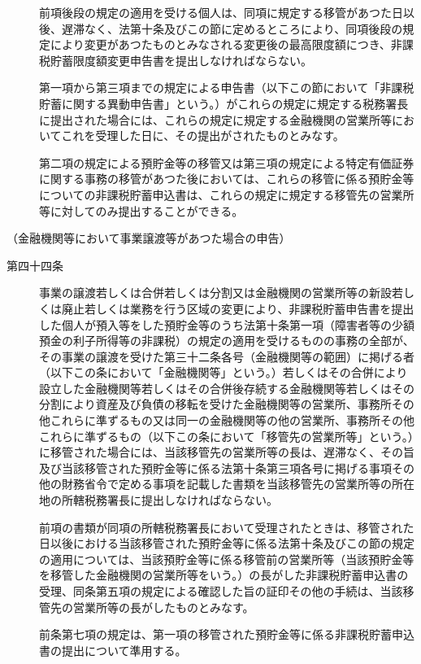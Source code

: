 \documentclass[twocolumn,a4j,10pt]{ltjtarticle}
\begin{document}
\begin{description}
\item[]前項後段の規定の適用を受ける個人は、同項に規定する移管があつた日以後、遅滞なく、法第十条及びこの節に定めるところにより、同項後段の規定により変更があつたものとみなされる変更後の最高限度額につき、非課税貯蓄限度額変更申告書を提出しなければならない。
\item[]第一項から第三項までの規定による申告書（以下この節において「非課税貯蓄に関する異動申告書」という。）がこれらの規定に規定する税務署長に提出された場合には、これらの規定に規定する金融機関の営業所等においてこれを受理した日に、その提出がされたものとみなす。
\item[]第二項の規定による預貯金等の移管又は第三項の規定による特定有価証券に関する事務の移管があつた後においては、これらの移管に係る預貯金等についての非課税貯蓄申込書は、これらの規定に規定する移管先の営業所等に対してのみ提出することができる。
\end{description}
\noindent\hspace{10pt}（金融機関等において事業譲渡等があつた場合の申告）
\begin{description}
\item[第四十四条]事業の譲渡若しくは合併若しくは分割又は金融機関の営業所等の新設若しくは廃止若しくは業務を行う区域の変更により、非課税貯蓄申告書を提出した個人が預入等をした預貯金等のうち法第十条第一項（障害者等の少額預金の利子所得等の非課税）の規定の適用を受けるものの事務の全部が、その事業の譲渡を受けた第三十二条各号（金融機関等の範囲）に掲げる者（以下この条において「金融機関等」という。）若しくはその合併により設立した金融機関等若しくはその合併後存続する金融機関等若しくはその分割により資産及び負債の移転を受けた金融機関等の営業所、事務所その他これらに準ずるもの又は同一の金融機関等の他の営業所、事務所その他これらに準ずるもの（以下この条において「移管先の営業所等」という。）に移管された場合には、当該移管先の営業所等の長は、遅滞なく、その旨及び当該移管された預貯金等に係る法第十条第三項各号に掲げる事項その他の財務省令で定める事項を記載した書類を当該移管先の営業所等の所在地の所轄税務署長に提出しなければならない。
\item[]前項の書類が同項の所轄税務署長において受理されたときは、移管された日以後における当該移管された預貯金等に係る法第十条及びこの節の規定の適用については、当該預貯金等に係る移管前の営業所等（当該預貯金等を移管した金融機関の営業所等をいう。）の長がした非課税貯蓄申込書の受理、同条第五項の規定による確認した旨の証印その他の手続は、当該移管先の営業所等の長がしたものとみなす。
\item[]前条第七項の規定は、第一項の移管された預貯金等に係る非課税貯蓄申込書の提出について準用する。
\end{description}
\end{document}
